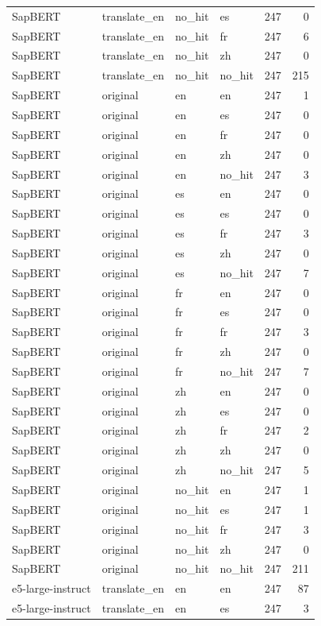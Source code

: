 \begin{tabular}{llllrr}
SapBERT & translate\_en & no\_hit & es & 247 & 0 \\
SapBERT & translate\_en & no\_hit & fr & 247 & 6 \\
SapBERT & translate\_en & no\_hit & zh & 247 & 0 \\
SapBERT & translate\_en & no\_hit & no\_hit & 247 & 215 \\
SapBERT & original & en & en & 247 & 1 \\
SapBERT & original & en & es & 247 & 0 \\
SapBERT & original & en & fr & 247 & 0 \\
SapBERT & original & en & zh & 247 & 0 \\
SapBERT & original & en & no\_hit & 247 & 3 \\
SapBERT & original & es & en & 247 & 0 \\
SapBERT & original & es & es & 247 & 0 \\
SapBERT & original & es & fr & 247 & 3 \\
SapBERT & original & es & zh & 247 & 0 \\
SapBERT & original & es & no\_hit & 247 & 7 \\
SapBERT & original & fr & en & 247 & 0 \\
SapBERT & original & fr & es & 247 & 0 \\
SapBERT & original & fr & fr & 247 & 3 \\
SapBERT & original & fr & zh & 247 & 0 \\
SapBERT & original & fr & no\_hit & 247 & 7 \\
SapBERT & original & zh & en & 247 & 0 \\
SapBERT & original & zh & es & 247 & 0 \\
SapBERT & original & zh & fr & 247 & 2 \\
SapBERT & original & zh & zh & 247 & 0 \\
SapBERT & original & zh & no\_hit & 247 & 5 \\
SapBERT & original & no\_hit & en & 247 & 1 \\
SapBERT & original & no\_hit & es & 247 & 1 \\
SapBERT & original & no\_hit & fr & 247 & 3 \\
SapBERT & original & no\_hit & zh & 247 & 0 \\
SapBERT & original & no\_hit & no\_hit & 247 & 211 \\
e5-large-instruct & translate\_en & en & en & 247 & 87 \\
e5-large-instruct & translate\_en & en & es & 247 & 3 \\

\end{tabular}

